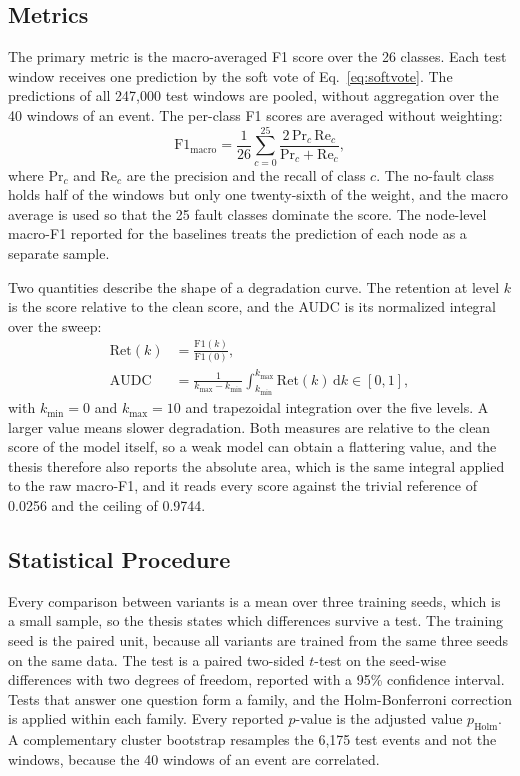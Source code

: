 \documentclass[MTech]{ugthesis}
\begin{document}
\subsection{Metrics}

The primary metric is the macro-averaged F1 score over the 26 classes. Each test window receives one prediction by the soft vote of Eq.~\eqref{eq:softvote}. The predictions of all 247,000 test windows are pooled, without aggregation over the 40 windows of an event. The per-class F1 scores are averaged without weighting:
\begin{equation}
\mathrm{F1}_{\mathrm{macro}}=\frac{1}{26}\sum_{c=0}^{25}\frac{2\,\mathrm{Pr}_c\,\mathrm{Re}_c}{\mathrm{Pr}_c+\mathrm{Re}_c},
\label{eq:f1}
\end{equation}
where $\mathrm{Pr}_c$ and $\mathrm{Re}_c$ are the precision and the recall of class $c$. The no-fault class holds half of the windows but only one twenty-sixth of the weight, and the macro average is used so that the 25 fault classes dominate the score. The node-level macro-F1 reported for the baselines treats the prediction of each node as a separate sample.

Two quantities describe the shape of a degradation curve. The retention at level $k$ is the score relative to the clean score, and the \ac{AUDC} is its normalized integral over the sweep:
\begin{align}
\mathrm{Ret}(k)&=\frac{\mathrm{F1}(k)}{\mathrm{F1}(0)}, \label{eq:ret}\\
\mathrm{AUDC}&=\frac{1}{k_{\max}-k_{\min}}\int_{k_{\min}}^{k_{\max}}\mathrm{Ret}(k)\,\mathrm{d}k\in[0,1], \label{eq:audc}
\end{align}
with $k_{\min}=0$ and $k_{\max}=10$ and trapezoidal integration over the five levels. A larger value means slower degradation. Both measures are relative to the clean score of the model itself, so a weak model can obtain a flattering value, and the thesis therefore also reports the absolute area, which is the same integral applied to the raw macro-F1, and it reads every score against the trivial reference of 0.0256 and the ceiling of 0.9744.

\subsection{Statistical Procedure}

Every comparison between variants is a mean over three training seeds, which is a small sample, so the thesis states which differences survive a test. The training seed is the paired unit, because all variants are trained from the same three seeds on the same data. The test is a paired two-sided $t$-test on the seed-wise differences with two degrees of freedom, reported with a 95\% confidence interval. Tests that answer one question form a family, and the Holm-Bonferroni correction is applied within each family. Every reported $p$-value is the adjusted value $p_{\mathrm{Holm}}$. A complementary cluster bootstrap resamples the 6,175 test events and not the windows, because the 40 windows of an event are correlated.
\end{document}
